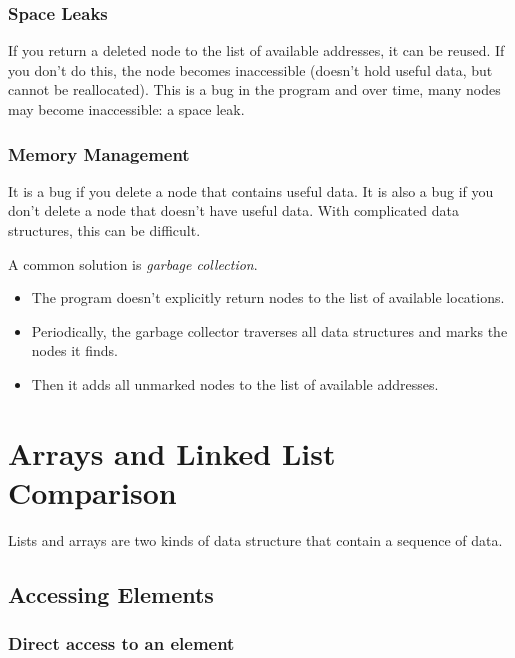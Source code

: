 \subsubsection{Space Leaks}\label{ssub:space_leaks}

If you return a deleted node to the list of available addresses, it can be reused.
If you don't do this, the node becomes inaccessible (doesn't hold useful data, but cannot be reallocated).
This is a bug in the program and over time, many nodes may become inaccessible: a space leak.

\subsubsection{Memory Management}\label{ssub:memory_management}

It is a bug if you delete a node that contains useful data.
It is also a bug if you don't delete a node that doesn't have useful data.
With complicated data structures, this can be difficult.

A common solution is \emph{garbage collection}.
\begin{itemize}
	\item The program doesn't explicitly return nodes to the list of available locations.
	\item Periodically, the garbage collector traverses all data structures and marks the nodes it finds.
	\item Then it adds all unmarked nodes to the list of available addresses.
\end{itemize}

\section{Arrays and Linked List Comparison}\label{sec:arrays_and_linked_list_comparison}

Lists and arrays are two kinds of data structure that contain a sequence of data.

\subsection{Accessing Elements}\label{sub:accessing_elements}

\subsubsection{Direct access to an element}\label{ssub:direct_access_to_an_element}

